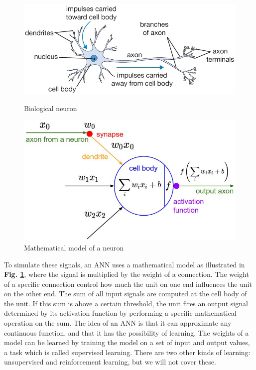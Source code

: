 \begin{figure}
    \begin{minipage}{0.5\textwidth}
        \centering
            \includegraphics[width=1\textwidth]{fig/neuron}
            \caption{Biological neuron\cite{cs231n_part1}}
            \label{fig1}
    \end{minipage}
    \begin{minipage}{0.4\textwidth}
        \centering
            \includegraphics[width=1\textwidth]{fig/neuron_model}
            \caption{Mathematical model of a neuron\cite{cs231n_part1}}
            \label{fig2}
    \end{minipage}
\end{figure}

\noindent To simulate these signals, an ANN uses a mathematical model as illustrated in \textbf{Fig. \ref{fig2}}, where the signal is multiplied by the weight of a connection. The weight of a specific connection control how much the unit on one end influences the unit on the other end. The sum of all input signals are computed at the cell body of the unit. If this sum is above a certain threshold, the unit fires an output signal determined by its activation function by performing a specific mathematical operation on the sum. The idea of an ANN is that it can approximate any continuous function, and that it has the possibility of learning. The weights of a model can be learned by training the model on a set of input and output values, a task which is called supervised learning. There are two other kinds of learning: unsupervised and reinforcement learning, but we will not cover these.\\

